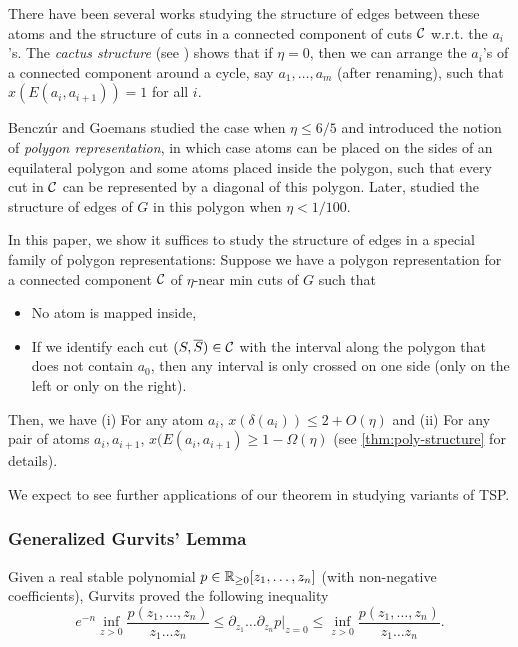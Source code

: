 There have been  several works studying the structure of edges between these atoms and the structure of cuts in a connected component of cuts ${\cal C}$ w.r.t. the $a_i$'s. The {\em cactus structure} (see \cite{DKL76}) shows that if $\eta=0$, then we can arrange the $a_i$'s of a connected component around a cycle, say $a_1,\dots,a_m$ (after renaming), such that $x(E(a_i,a_{i+1}))=1$ for all $i$.

Bencz\'ur and Goemans \cite{Ben95,BG08} studied the case when $\eta\leq 6/5$ and introduced the notion of {\em polygon representation}, in which case atoms can be placed on the sides of an equilateral polygon and some atoms  placed inside  the polygon, such that every cut in ${\cal C}$ can be represented by a diagonal of this polygon. Later, \cite{OSS11} studied the structure of edges of $G$ in this polygon when $\eta<1/100$.

In this paper, we show it suffices to study the structure of edges in a special family of polygon representations: Suppose we have a polygon representation for a connected component ${\cal C}$ of $\eta$-near min cuts of $G$ such that 
\begin{itemize}
\item No atom is mapped inside,
\item If we identify each cut $(S,\overline{S})\in {\cal C}$ with the interval along the polygon that does not contain $a_0$, then any interval is only crossed on one side (only on the left or only on the right).
\end{itemize}
Then, we have (i) For any atom $a_i$, $x(\delta(a_i))\leq 2+O(\eta)$ and (ii) For any pair of atoms $a_i,a_{i+1}$, $x(E(a_i,a_{i+1})\geq 1-\Omega(\eta)$ (see \cref{thm:poly-structure} for details).

We expect to see further applications of our theorem in studying variants of TSP.


\subsubsection{Generalized Gurvits' Lemma}
Given a real stable polynomial $p\in\mathbb{R}_{\geq 0}[z_1,\dots,z_n]$ (with non-negative coefficients), Gurvits proved the following inequality \cite{Gur06,Gur08}
\begin{equation}
	e^{-n}\inf_{z>0} \frac{p(z_1,\dots,z_n)}{z_1\dots z_n}\leq \partial_{z_1}\dots\partial_{z_n} p|_{z=0} \leq \inf_{z>0} \frac{p(z_1,\dots,z_n)}{z_1\dots z_n}.
\end{equation}


